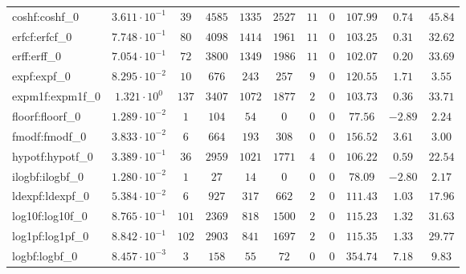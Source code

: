 \begin{tabular}{|l|c|c|c|c|c|c|c|c|c|c|}
coshf:coshf\_0               & $ 3.611 \cdot 10^{-1} $ & $ 39     $ & $ 4585  $ & $ 1335  $ & $ 2527  $ & $ 11  $ & $ 0 $ & $ 107.99      $ & $ 0.74    $ & $ 45.84   $ \\
erfcf:erfcf\_0               & $ 7.748 \cdot 10^{-1} $ & $ 80     $ & $ 4098  $ & $ 1414  $ & $ 1961  $ & $ 11  $ & $ 0 $ & $ 103.25      $ & $ 0.31    $ & $ 32.62   $ \\
erff:erff\_0                 & $ 7.054 \cdot 10^{-1} $ & $ 72     $ & $ 3800  $ & $ 1349  $ & $ 1986  $ & $ 11  $ & $ 0 $ & $ 102.07      $ & $ 0.20    $ & $ 33.69   $ \\
expf:expf\_0                 & $ 8.295 \cdot 10^{-2} $ & $ 10     $ & $ 676   $ & $ 243   $ & $ 257   $ & $ 9   $ & $ 0 $ & $ 120.55      $ & $ 1.71    $ & $ 3.55    $ \\
expm1f:expm1f\_0             & $ 1.321 \cdot 10^{0}  $ & $ 137    $ & $ 3407  $ & $ 1072  $ & $ 1877  $ & $ 2   $ & $ 0 $ & $ 103.73      $ & $ 0.36    $ & $ 33.71   $ \\
floorf:floorf\_0             & $ 1.289 \cdot 10^{-2} $ & $ 1      $ & $ 104   $ & $ 54    $ & $ 0     $ & $ 0   $ & $ 0 $ & $ 77.56       $ & $ -2.89   $ & $ 2.24    $ \\
fmodf:fmodf\_0               & $ 3.833 \cdot 10^{-2} $ & $ 6      $ & $ 664   $ & $ 193   $ & $ 308   $ & $ 0   $ & $ 0 $ & $ 156.52      $ & $ 3.61    $ & $ 3.00    $ \\
hypotf:hypotf\_0             & $ 3.389 \cdot 10^{-1} $ & $ 36     $ & $ 2959  $ & $ 1021  $ & $ 1771  $ & $ 4   $ & $ 0 $ & $ 106.22      $ & $ 0.59    $ & $ 22.54   $ \\
ilogbf:ilogbf\_0             & $ 1.280 \cdot 10^{-2} $ & $ 1      $ & $ 27    $ & $ 14    $ & $ 0     $ & $ 0   $ & $ 0 $ & $ 78.09       $ & $ -2.80   $ & $ 2.17    $ \\
ldexpf:ldexpf\_0             & $ 5.384 \cdot 10^{-2} $ & $ 6      $ & $ 927   $ & $ 317   $ & $ 662   $ & $ 2   $ & $ 0 $ & $ 111.43      $ & $ 1.03    $ & $ 17.96   $ \\
log10f:log10f\_0             & $ 8.765 \cdot 10^{-1} $ & $ 101    $ & $ 2369  $ & $ 818   $ & $ 1500  $ & $ 2   $ & $ 0 $ & $ 115.23      $ & $ 1.32    $ & $ 31.63   $ \\
log1pf:log1pf\_0             & $ 8.842 \cdot 10^{-1} $ & $ 102    $ & $ 2903  $ & $ 841   $ & $ 1697  $ & $ 2   $ & $ 0 $ & $ 115.35      $ & $ 1.33    $ & $ 29.77   $ \\
logbf:logbf\_0               & $ 8.457 \cdot 10^{-3} $ & $ 3      $ & $ 158   $ & $ 55    $ & $ 72    $ & $ 0   $ & $ 0 $ & $ 354.74      $ & $ 7.18    $ & $ 9.83    $ \\

\end{tabular}

